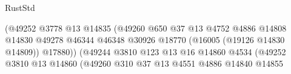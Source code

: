 \begin{lexlean}{RustStd}
\begin{coremodule}
                                                          (@49252
                                                            @3778
                                                            @13
                                                            @14835
                                                            (@49260
                                                              @650
                                                              @37
                                                              @13
                                                              @4752
                                                              @4886
                                                              @14808
                                                              @14830
                                                              @49278
                                                              @46344
                                                              @46348
                                                              @30926
                                                              @18770
                                                              (@16005 (@19126 @14830 @14809))
                                                              @17880))
                                                          (@49244
                                                            @3810
                                                            @123
                                                            @13
                                                            @16
                                                            @14860
                                                            @4534
                                                            (@49252
                                                              @3810
                                                              @13
                                                              @14860
                                                              (@49260
                                                                @310
                                                                @37
                                                                @13
                                                                @4551
                                                                @4886
                                                                @14840
                                                                @14855

\end{coremodule}
\end{lexlean}
